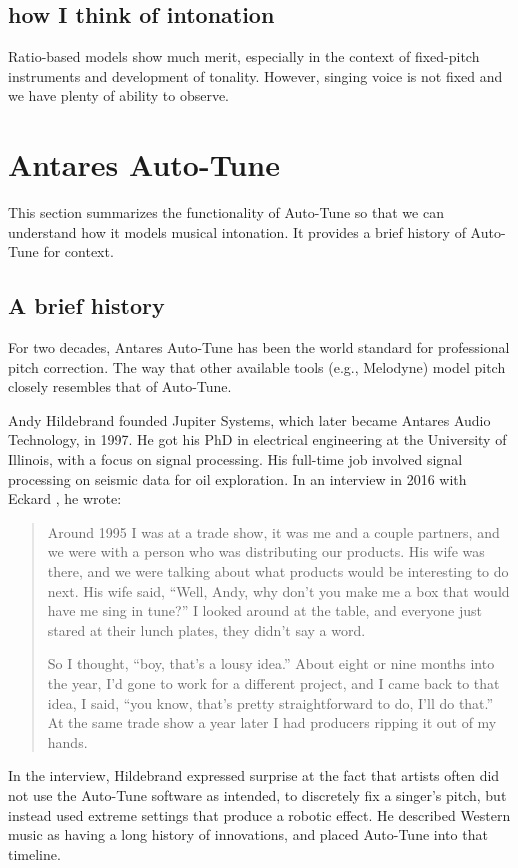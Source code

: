 \subsection{how I think of intonation}
Ratio-based models show much merit, especially in the context of fixed-pitch instruments and development of tonality. However, singing voice is not fixed and we have plenty of ability to observe.

\section{Antares Auto-Tune}
This section summarizes the functionality of Auto-Tune so that we can understand how it models musical intonation. It provides a brief history of Auto-Tune for context. 

\subsection{A brief history}
For two decades, Antares Auto-Tune has been the world standard for professional pitch correction. The way that other available tools (e.g.,  Melodyne) model pitch closely resembles that of Auto-Tune.

Andy Hildebrand founded Jupiter Systems, which later became Antares Audio Technology, in 1997. He got his PhD in electrical engineering at the University of Illinois, with a focus on signal processing. His full-time job involved signal processing on seismic data for oil exploration. In an interview in 2016 with Eckard \cite{eckard2016}, he wrote: 
\begin{quotation}Around 1995 I was at a trade show, it was me and a couple partners, and we were with a person who was distributing our products. His wife was there, and we were talking about what products would be interesting to do next. His wife said, ``Well, Andy, why don't you make me a box that would have me sing in tune?'' I looked around at the table, and everyone just stared at their lunch plates, they didn't say a word.

So I thought, ``boy, that's a lousy idea.'' About eight or nine months into the year, I'd gone to work for a different project, and I came back to that idea, I said, ``you know, that's pretty straightforward to do, I'll do that.'' At the same trade show a year later I had producers ripping it out of my hands.
\end{quotation}
In the interview, Hildebrand expressed surprise at the fact that artists often did not use the Auto-Tune software as intended, to discretely fix a singer's pitch, but instead used extreme settings that produce a robotic effect. He described Western music as having a long history of innovations, and placed Auto-Tune into that timeline. 

